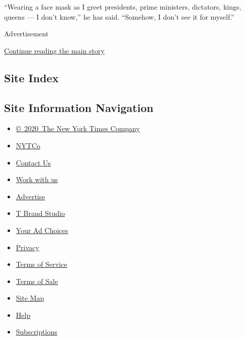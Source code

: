 ``Wearing a face mask as I greet presidents, prime ministers, dictators,
kings, queens --- I don't know,'' he has said. ``Somehow, I don't see it
for myself.''

Advertisement

\protect\hyperlink{after-bottom}{Continue reading the main story}

\hypertarget{site-index}{%
\subsection{Site Index}\label{site-index}}

\hypertarget{site-information-navigation}{%
\subsection{Site Information
Navigation}\label{site-information-navigation}}

\begin{itemize}
\tightlist
\item
  \href{https://help.nytimes3xbfgragh.onion/hc/en-us/articles/115014792127-Copyright-notice}{©~2020~The
  New York Times Company}
\end{itemize}

\begin{itemize}
\tightlist
\item
  \href{https://www.nytco.com/}{NYTCo}
\item
  \href{https://help.nytimes3xbfgragh.onion/hc/en-us/articles/115015385887-Contact-Us}{Contact
  Us}
\item
  \href{https://www.nytco.com/careers/}{Work with us}
\item
  \href{https://nytmediakit.com/}{Advertise}
\item
  \href{http://www.tbrandstudio.com/}{T Brand Studio}
\item
  \href{https://www.nytimes3xbfgragh.onion/privacy/cookie-policy\#how-do-i-manage-trackers}{Your
  Ad Choices}
\item
  \href{https://www.nytimes3xbfgragh.onion/privacy}{Privacy}
\item
  \href{https://help.nytimes3xbfgragh.onion/hc/en-us/articles/115014893428-Terms-of-service}{Terms
  of Service}
\item
  \href{https://help.nytimes3xbfgragh.onion/hc/en-us/articles/115014893968-Terms-of-sale}{Terms
  of Sale}
\item
  \href{https://spiderbites.nytimes3xbfgragh.onion}{Site Map}
\item
  \href{https://help.nytimes3xbfgragh.onion/hc/en-us}{Help}
\item
  \href{https://www.nytimes3xbfgragh.onion/subscription?campaignId=37WXW}{Subscriptions}
\end{itemize}
